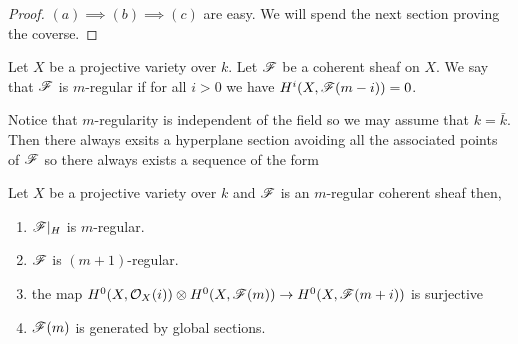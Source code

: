 \documentclass[12pt]{article}
\begin{document}
\begin{proof}
$(a) \implies (b) \implies (c)$ are easy. We will spend the next section proving the coverse.
\end{proof}

\begin{defn}
Let $X$ be a projective variety over $k$. Let $\mathscr{F}$ be a coherent sheaf on $X$. We say that $\mathscr{F}$ is $m$-regular if for all $i > 0$ we have $H^i(X, \mathscr{F}(m-i)) = 0$. 
\end{defn}

\begin{rmk}
Notice that $m$-regularity is independent of the field so we may assume that $k = \bar{k}$. Then there always exsits a hyperplane section avoiding all the associated points of $\mathscr{F}$ so there always exists a sequence of the form
\begin{center}
\end{center}
\end{rmk}

\begin{prop}
Let $X$ be a projective variety over $k$ and $\mathscr{F}$ is an $m$-regular coherent sheaf then,
\begin{enumerate}
\item $\mathscr{F}|_H$ is $m$-regular.
\item $\mathscr{F}$ is $(m+1)$-regular.
\item the map $H^0(X, \mathcal{O}_{X}(i)) \otimes H^0(X, \mathscr{F}(m)) \to H^0(X, \mathscr{F}(m + i))$ is surjective
\item $\mathscr{F}(m)$ is generated by global sections.
\end{enumerate}
\end{prop}
\end{document}
